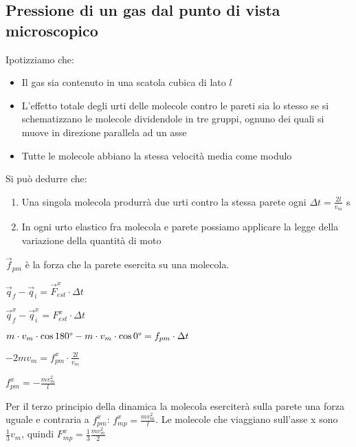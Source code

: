 \subsection{Pressione di un gas dal punto di vista microscopico}
    Ipotizziamo che:
    \begin{itemize}
        \item Il gas sia contenuto in una scatola cubica di lato $l$
        \item L'effetto totale degli urti delle molecole contro le pareti sia lo stesso se si schematizzano le molecole dividendole in tre gruppi, ognuno dei quali si muove in direzione parallela ad un asse
        \item Tutte le molecole abbiano la stessa velocità media come modulo
    \end{itemize}
    Si può dedurre che:
    \begin{enumerate}
        \item Una singola molecola produrrà due urti contro la stessa parete ogni $\Delta t=\frac{2l}{v_m}$ s
        \item In ogni urto elastico fra molecola e parete possiamo applicare la legge della variazione della quantità di moto
    \end{enumerate}
    \par $\vec{f}_{pm}$ è la forza che la parete esercita su una molecola.
    \par $\vec{q}_f-\vec{q}_i=\vec{F}_{est}^{x}\cdot\Delta t$
    \par $\vec{q}_f^x-\vec{q}_i^x=F_{est}^{x}\cdot\Delta t$
    \par $m\cdot v_m\cdot\cos 180\degree-m\cdot v_m\cdot\cos 0\degree=f_{pm}\cdot\Delta t$
    \par $-2mv_m=f_{pm}^x\cdot\frac{2l}{v_m}$
    \par $f_{pm}^x=-\frac{mv^2_m}{l}$
    \par Per il terzo principio della dinamica la molecola eserciterà sulla parete una forza uguale e contraria a $f_{pm}^{x}$: $f_{mp}^x=\frac{mv^2_m}{l}$.
    Le molecole che viaggiano sull'asse x sono $\frac{1}{3}v_m$, quindi $F_{mp}^x=\frac{1}{3}\frac{mv_m^2}{2}$